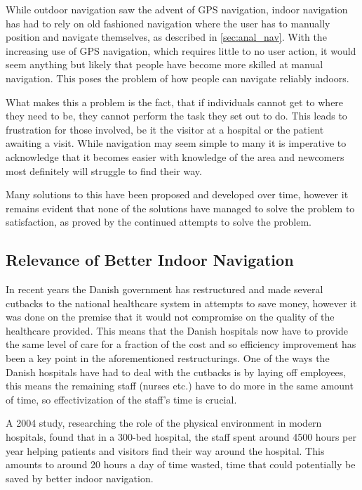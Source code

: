 While outdoor navigation saw the advent of GPS navigation, indoor navigation has had to rely on old fashioned navigation where the user has to manually position and navigate themselves, as described in \cref{sec:anal_nav}. With the increasing use of GPS navigation, which requires little to no user action, it would seem anything but likely that people have become more skilled at manual navigation. This poses the problem of how people can navigate reliably indoors.

What makes this a problem is the fact, that if individuals cannot get to where they need to be, they cannot perform the task they set out to do. This leads to frustration for those involved, be it the visitor at a hospital or the patient awaiting a visit. While navigation may seem simple to many it is imperative to acknowledge that it becomes easier with knowledge of the area and newcomers most definitely will struggle to find their way.

Many solutions to this have been proposed and developed over time, however it remains evident that none of the solutions have managed to solve the problem to satisfaction, as proved by the continued attempts to solve the problem\cite{skejby_attempt}.

\subsection{Relevance of Better Indoor Navigation}
In recent years the Danish government has restructured and made several cutbacks to the national healthcare system in attempts to save money\cite{cutback_danNHS}, however it was done on the premise that it would not compromise on the quality of the healthcare provided. This means that the Danish hospitals now have to provide the same level of care for a fraction of the cost and so efficiency improvement has been a key point in the aforementioned restructurings. One of the ways the Danish hospitals have had to deal with the cutbacks is by laying off employees\cite{cutback_firing}, this means the remaining staff (nurses etc.) have to do more in the same amount of time, so effectivization of the staff's time is crucial.

A 2004 study\cite{twaste_2004}, researching the role of the physical environment in modern hospitals, found that in a 300-bed hospital, the staff spent around 4500 hours per year helping patients and visitors find their way around the hospital. This amounts to around 20 hours a day of time wasted, time that could potentially be saved by better indoor navigation.

